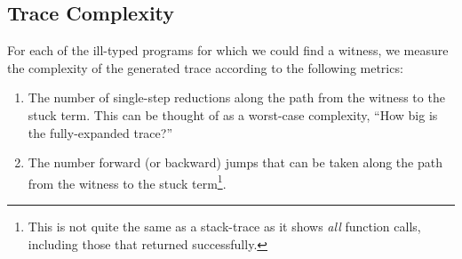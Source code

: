 \subsection{Trace Complexity}
\label{sec:trace-complexity}
For each of the ill-typed programs for which we could find a witness, we
measure the complexity of the generated trace according to the following
metrics:
%
\begin{enumerate}
\item The number of single-step reductions along the path from the
  witness to the stuck term. This can be thought of as a worst-case
  complexity, \ie ``How big is the fully-expanded trace?''
\item The number forward (or backward) jumps that can be taken along the
  path from the witness to the stuck term\footnote{This is not quite the same as
  a stack-trace as it shows \emph{all} function calls, including those
  that returned successfully.}.
\end{enumerate}
%
